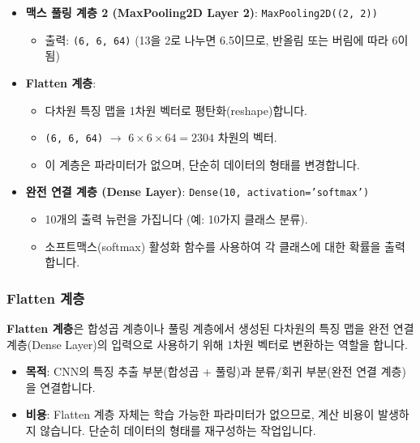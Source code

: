 \documentclass[11pt,a4paper]{article}
\theoremstyle{definition}
\begin{document}
\begin{tcolorbox}[examplebox, title=\textbf{예시}]
\begin{itemize}
\begin{itemize}
            \item 64개의 필터를 사용합니다.
            \item 각 필터의 크기는 $3 \times 3$입니다.
            \item 입력 채널이 32개이므로, 각 필터는 $3 \times 3 \times 32$의 가중치를 가집니다.
            \item 출력 크기는 $(15-3+1) \times (15-3+1) = 13 \times 13$이 됩니다.
            \item 출력: \texttt{(13, 13, 64)}
        \end{itemize}
    \item \textbf{맥스 풀링 계층 2 (MaxPooling2D Layer 2)}: \texttt{MaxPooling2D((2, 2))}
        \begin{itemize}
            \item 출력: \texttt{(6, 6, 64)} (13을 2로 나누면 6.5이므로, 반올림 또는 버림에 따라 6이 됨)
        \end{itemize}
    \item \textbf{Flatten 계층}:
        \begin{itemize}
            \item 다차원 특징 맵을 1차원 벡터로 평탄화(reshape)합니다.
            \item \texttt{(6, 6, 64)} $\rightarrow$ $6 \times 6 \times 64 = 2304$ 차원의 벡터.
            \item 이 계층은 파라미터가 없으며, 단순히 데이터의 형태를 변경합니다.
        \end{itemize}
    \item \textbf{완전 연결 계층 (Dense Layer)}: \texttt{Dense(10, activation='softmax')}
        \begin{itemize}
            \item 10개의 출력 뉴런을 가집니다 (예: 10가지 클래스 분류).
            \item 소프트맥스(softmax) 활성화 함수를 사용하여 각 클래스에 대한 확률을 출력합니다.
        \end{itemize}
\end{itemize}
\end{tcolorbox}

\subsubsection{Flatten 계층}
\begin{tcolorbox}[conceptbox, title=\textbf{핵심 개념}]
\textbf{Flatten 계층}은 합성곱 계층이나 풀링 계층에서 생성된 다차원의 특징 맵을 완전 연결 계층(Dense Layer)의 입력으로 사용하기 위해 1차원 벡터로 변환하는 역할을 합니다.
\end{tcolorbox}
\begin{itemize}
    \item \textbf{목적}: CNN의 특징 추출 부분(합성곱 + 풀링)과 분류/회귀 부분(완전 연결 계층)을 연결합니다.
    \item \textbf{비용}: Flatten 계층 자체는 학습 가능한 파라미터가 없으므로, 계산 비용이 발생하지 않습니다. 단순히 데이터의 형태를 재구성하는 작업입니다.
\end{itemize}
\end{document}
